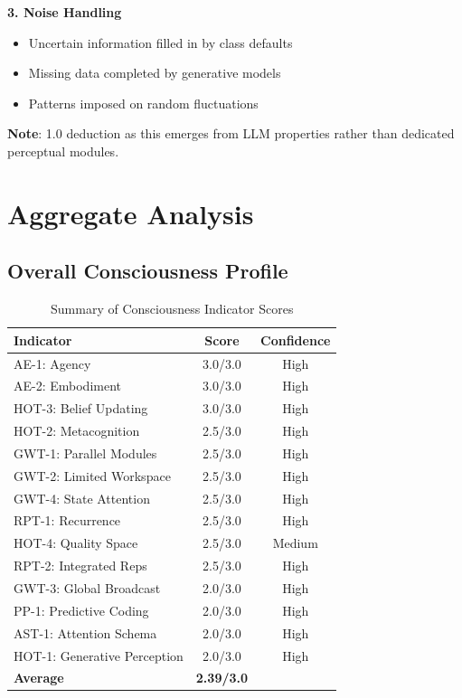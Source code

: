 \documentclass[12pt,a4paper]{article}
\begin{document}
\textbf{3. Noise Handling}
\begin{itemize}
    \item Uncertain information filled in by class defaults
    \item Missing data completed by generative models
    \item Patterns imposed on random fluctuations
\end{itemize}

\textbf{Note}: 1.0 deduction as this emerges from LLM properties rather than dedicated perceptual modules.

\section{Aggregate Analysis}

\subsection{Overall Consciousness Profile}

\begin{table}[H]
\centering
\caption{Summary of Consciousness Indicator Scores}
\begin{tabular}{lcc}
\toprule
\textbf{Indicator} & \textbf{Score} & \textbf{Confidence} \\
\midrule
AE-1: Agency & 3.0/3.0 & High \\
AE-2: Embodiment & 3.0/3.0 & High \\
HOT-3: Belief Updating & 3.0/3.0 & High \\
HOT-2: Metacognition & 2.5/3.0 & High \\
GWT-1: Parallel Modules & 2.5/3.0 & High \\
GWT-2: Limited Workspace & 2.5/3.0 & High \\
GWT-4: State Attention & 2.5/3.0 & High \\
RPT-1: Recurrence & 2.5/3.0 & High \\
HOT-4: Quality Space & 2.5/3.0 & Medium \\
RPT-2: Integrated Reps & 2.5/3.0 & High \\
GWT-3: Global Broadcast & 2.0/3.0 & High \\
PP-1: Predictive Coding & 2.0/3.0 & High \\
AST-1: Attention Schema & 2.0/3.0 & High \\
HOT-1: Generative Perception & 2.0/3.0 & High \\
\midrule
\textbf{Average} & \textbf{2.39/3.0} & \\
\bottomrule
\end{tabular}
\end{table}
\end{document}
